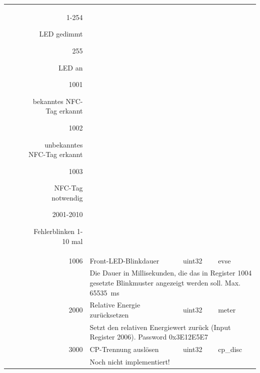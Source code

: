 \documentclass[a4paper,10pt]{article}
\newcommand{\tdesc}[1]{\multicolumn{3}{l}{\footnotesize #1}}
\begin{document}
\begin{tabularx}{\textwidth}{rXll}
\begin{description}
                    \item[1-254] LED gedimmt
                    \item[255] LED an
                    \item[1001] bekanntes NFC-Tag erkannt
                    \item[1002] unbekanntes NFC-Tag erkannt
                    \item[1003] NFC-Tag notwendig
                    \item[2001-2010] Fehlerblinken 1-10 mal
                \end{description} & &               \\ \cmidrule{2-4}
1006          & Front-LED-Blinkdauer                    & uint32       & evse                                                   \\
              & \tdesc{Die Dauer in Millisekunden, die das in Register 1004 gesetzte Blinkmuster angezeigt werden soll. Max. \SI{65535}{\milli\second}}               \\ \cmidrule{2-4}
2000          & Relative Energie zurücksetzen           & uint32       & meter                                                  \\
              & \tdesc{Setzt den relativen Energiewert zurück (Input Register 2006). Password 0x3E12E5E7}                       \\ \cmidrule{2-4}
3000          & CP-Trennung auslösen                    & uint32       & cp\_disc                                               \\
              & \tdesc{Noch nicht implementiert!}                                                                               \\ \bottomrule
\end{tabularx}

\newpage
\end{document}
